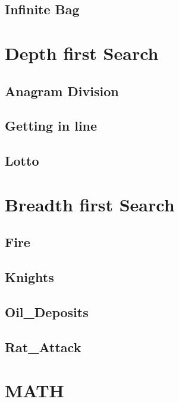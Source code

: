     \subsection{Infinite Bag}
        

\section{Depth first Search}
    \subsection{Anagram Division}
            
    \subsection{Getting in line}
            
    \subsection{Lotto}
            

\section{Breadth first Search}
    \subsection{Fire}
            
    \subsection{Knights}
            
    \subsection{Oil_Deposits}
            
    \subsection{Rat_Attack}
            

\section{MATH}
